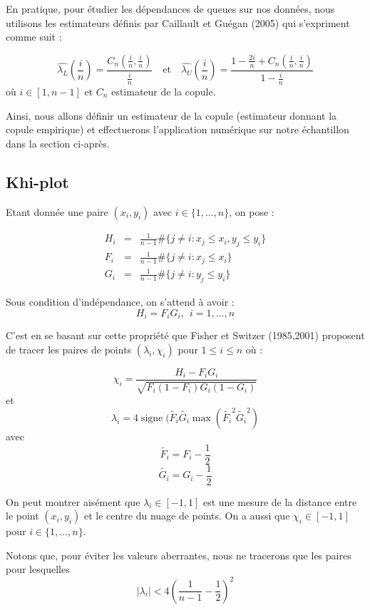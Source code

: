 En pratique, pour étudier les dépendances de queues sur nos données, nous utilisons les estimateurs définis par Caillault et Guégan
(2005) qui s'expriment comme suit :

$$
\widehat{\lambda_L}\left(\frac{i}{n}\right) = \frac{C_n(\frac{i}{n},\frac{i}{n})}{\frac{i}{n}}    \text{~~~et~~~} 
\widehat{\lambda_U}\left(\frac{i}{n}\right) = \frac{1-\frac{2i}{n} + C_n(\frac{i}{n},\frac{i}{n})}{ 1 - \frac{i}{n}}
$$
où $i \in [1,n-1]$ et $C_n$ estimateur de la copule.

Ainsi, nous allons définir un estimateur de la copule (estimateur donnant la copule empirique) et effectuerons l'application numérique sur notre échantillon 
dans la section ci-après.

\subsection{Khi-plot}

Etant donnée une paire $(x_i,y_i)$ avec $i \in \{1,...,n\}$, on pose :

\begin{eqnarray*}
H_i &=& \frac{1}{n-1} \# \{j \neq i : x_j \leq x_i , y_j \leq y_i \} \\
F_i &=& \frac{1}{n-1} \# \{j \neq i : x_j \leq x_i \} \\
G_i &=& \frac{1}{n-1} \# \{j \neq i : y_j \leq y_i \} 
\end{eqnarray*}

Sous condition d'indépendance, on s'attend à avoir :
$$
H_i = F_i G_i, ~~i=1,...,n
$$

C'est en se basant sur cette propriété que Fisher et Switzer (1985,2001) proposent de tracer les paires de points $(\lambda_i,\chi_i)$ pour $1\leq i \leq n$ où :

$$
\chi_i = \frac{H_i-F_i G_i}{\sqrt{F_i(1-F_i)G_i(1-G_i)}}
$$
et
$$
\lambda_i = 4 \operatorname{signe}( \widetilde{F_i} \widetilde{G_i} \operatorname{max}(\widetilde{F_i}^2 \widetilde{G_i}^2  )
$$
avec
$$
\widetilde{F_i} = F_i - \frac{1}{2}
$$
$$
\widetilde{G_i} = G_i - \frac{1}{2}
$$

On peut montrer aisément que $\lambda_i \in [-1,1]$ est une mesure de la distance entre le point $(x_i,y_i)$ et le centre du nuage de points.
On a aussi que $\chi_i \in [-1,1]$ pour $i \in \{1,...,n\}$.

Notons que, pour éviter les valeurs aberrantes, nous ne tracerons que les paires pour lesquelles 
$$
|\lambda_i| < 4 \left(  \frac{1}{n-1} -\frac{1}{2} \right)^2
$$


